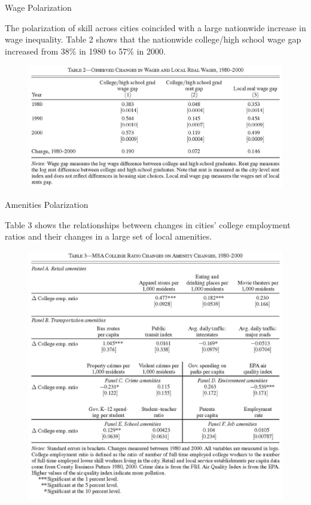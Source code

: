 \documentclass[aspectratio=169]{beamer}
\begin{document}

\begin{frame}{Wage Polarization}

The polarization of skill across cities coincided with a large nationwide increase in wage inequality.  Table 2 shows that the nationwide college/high school wage gap increased from 38\% in 1980 to 57\% in 2000.

\begin{figure}
    \centering
    \includegraphics[scale=0.85]{DiamondTable2.jpg}
    \label{fig:Table2}
\end{figure}
    
\end{frame}


\begin{frame}{Amenities Polarization}

Table 3 shows the relationships between changes in cities’ college employment ratios and their changes in a large set of local amenities.

\begin{figure}
    \centering
    \includegraphics[scale=0.47]{DiamondTable3.jpg}
    \label{fig:Table3}
\end{figure}
    
\end{frame}
\end{document}
